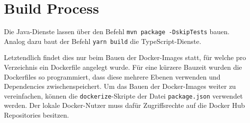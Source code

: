 \section{Build Process}

Die Java-Dienste lassen über den Befehl \verb|mvn package -DskipTests| bauen.
Analog dazu baut der Befehl \verb|yarn build| die TypeScript-Dienste.

Letztendlich findet dies nur beim Bauen der Docker-Images statt, für welche pro Verzeichnis ein Dockerfile angelegt wurde.
Für eine kürzere Bauzeit wurden die Dockerfiles so programmiert, dass diese mehrere Ebenen verwenden und Dependencies zwischenspeichert.
Um das Bauen der Docker-Images weiter zu vereinfachen, können die \verb|dockerize|-Skripte der Datei \verb|package.json| verwendet werden.
Der lokale Docker-Nutzer muss dafür Zugriffsrechte auf die Docker Hub Repositories besitzen.

